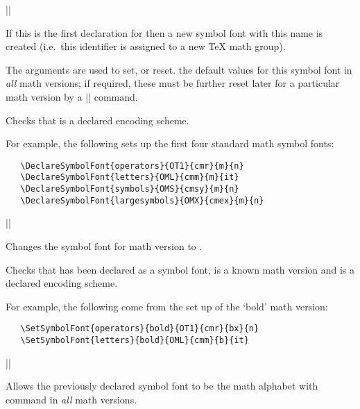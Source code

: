 \documentclass{ltxguide}[1995/11/28]
\begin{document}
\begin{decl}
  |\DeclareSymbolFont|   
                        
\end{decl}

If this is the first declaration for  then a new symbol font
with this name is created (i.e.~this identifier is assigned to a new
\TeX{} math group).

The arguments     are used to
set, or reset. the default values for this symbol font in \emph{all}
math versions; if required, these must be further reset later for a
particular math version by a |\SetSymbolFont| command.

Checks that  is a declared encoding scheme.

For example, the following sets up the first four standard math symbol
fonts:
\begin{verbatim}
   \DeclareSymbolFont{operators}{OT1}{cmr}{m}{n}
   \DeclareSymbolFont{letters}{OML}{cmm}{m}{it}
   \DeclareSymbolFont{symbols}{OMS}{cmsy}{m}{n}
   \DeclareSymbolFont{largesymbols}{OMX}{cmex}{m}{n}
\end{verbatim}

\begin{decl}
  |\SetSymbolFont|  \\
       \null\hfill {}   
\end{decl}

Changes the symbol font  for math version  to
   .

Checks that  has been declared as a symbol font, 
is a known math version and  is a declared encoding scheme.

For example, the following come from the set up of the `bold' math
version:
\begin{verbatim}
   \SetSymbolFont{operators}{bold}{OT1}{cmr}{bx}{n}
   \SetSymbolFont{letters}{bold}{OML}{cmm}{b}{it}
\end{verbatim}


\begin{decl}
  |\DeclareSymbolFontAlphabet|  
\end{decl}

Allows the previously declared symbol font  to be the math
alphabet with command  in \emph{all} math versions.
\end{document}
